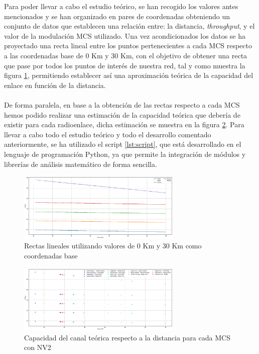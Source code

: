 	Para poder llevar a cabo el estudio teórico, se han recogido los valores antes mencionados y se han organizado en pares de coordenadas obteniendo un conjunto de datos que establecen una relación entre: la distancia, \textit{throughput}, y el valor de la modulación MCS utilizado. Una vez acondicionados los datos se ha proyectado una recta lineal entre los puntos pertenecientes a cada MCS respecto a las coordenadas base de 0 Km y 30 Km, con el objetivo de obtener una recta que pase por todos los puntos de interés de nuestra red, tal y como muestra la figura \ref{rectaspendiente}, permitiendo establecer así una aproximación teórica de la capacidad del enlace en función de la distancia.\\\\
	
	De forma paralela, en base a la obtención de las rectas respecto a cada MCS hemos podido realizar una estimación de la capacidad teórica que debería de existir para cada radioenlace, dicha estimación se muestra en la figura \ref{valoresmbps}. Para llevar a cabo todo el estudio teórico y todo el desarrollo comentado anteriormente, se ha utilizado el script \ref{lst:script}, que está desarrollado en el lenguaje de programación Python, ya que permite la integración de módulos y librerías de análisis matemático de forma sencilla.
	
	\begin{figure}[H]
		\centering
		\includegraphics[width=0.7\textwidth]{img/rectas.png}
		\caption{Rectas lineales utilizando valores de 0 Km y 30 Km como coordenadas base}
		\label{rectaspendiente}
	\end{figure}
	
	\begin{figure}[H]
		\centering
		\includegraphics[width=0.7\textwidth]{img/valoresmbps.png}
		\caption{Capacidad del canal teórica respecto a la distancia para cada MCS con NV2}
		\label{valoresmbps}
	\end{figure}
	
